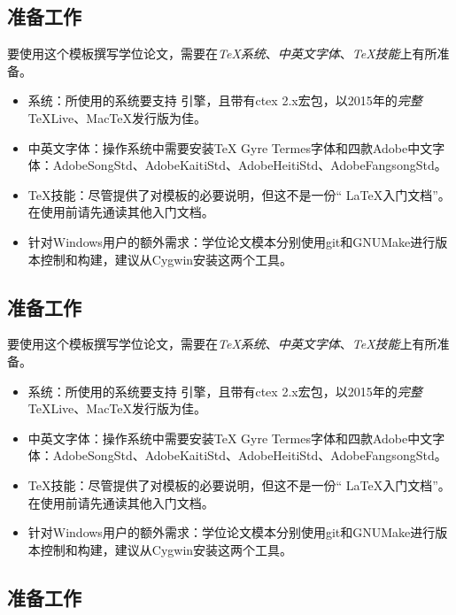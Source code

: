 \subsection{准备工作}
\label{sec:requirements}

要使用这个模板撰写学位论文，需要在\emph{TeX系统}、\emph{中英文字体}、\emph{TeX技能}上有所准备。

\begin{itemize}[noitemsep,topsep=0pt,parsep=0pt,partopsep=0pt]
	\item 系统：所使用的系统要支持 引擎，且带有ctex 2.x宏包，以2015年的\emph{完整}TeXLive、MacTeX发行版为佳。
	\item 中英文字体：操作系统中需要安装TeX Gyre Termes字体和四款Adobe中文字体：AdobeSongStd、AdobeKaitiStd、AdobeHeitiStd、AdobeFangsongStd。
	\item TeX技能：尽管提供了对模板的必要说明，但这不是一份“ \LaTeX 入门文档”。在使用前请先通读其他入门文档。
	\item 针对Windows用户的额外需求：学位论文模本分别使用git和GNUMake进行版本控制和构建，建议从Cygwin安装这两个工具。
\end{itemize}

\subsection{准备工作}
\label{sec:requirements}

要使用这个模板撰写学位论文，需要在\emph{TeX系统}、\emph{中英文字体}、\emph{TeX技能}上有所准备。

\begin{itemize}[noitemsep,topsep=0pt,parsep=0pt,partopsep=0pt]
	\item 系统：所使用的系统要支持 引擎，且带有ctex 2.x宏包，以2015年的\emph{完整}TeXLive、MacTeX发行版为佳。
	\item 中英文字体：操作系统中需要安装TeX Gyre Termes字体和四款Adobe中文字体：AdobeSongStd、AdobeKaitiStd、AdobeHeitiStd、AdobeFangsongStd。
	\item TeX技能：尽管提供了对模板的必要说明，但这不是一份“ \LaTeX 入门文档”。在使用前请先通读其他入门文档。
	\item 针对Windows用户的额外需求：学位论文模本分别使用git和GNUMake进行版本控制和构建，建议从Cygwin安装这两个工具。
\end{itemize}

\subsection{准备工作}
\label{sec:requirements}

